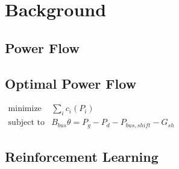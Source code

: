 \chapter{Background}

\section{Power Flow}

\section{Optimal Power Flow}

$
  \begin{array}{ll}
  \mbox{minimize}   & \sum_i c_i (P_i) \\
  \mbox{subject to} & B_{bus} \theta = P_g - P_d - P_{bus,shift} - G_{sh}
  \end{array}
$
\section{Reinforcement Learning}
